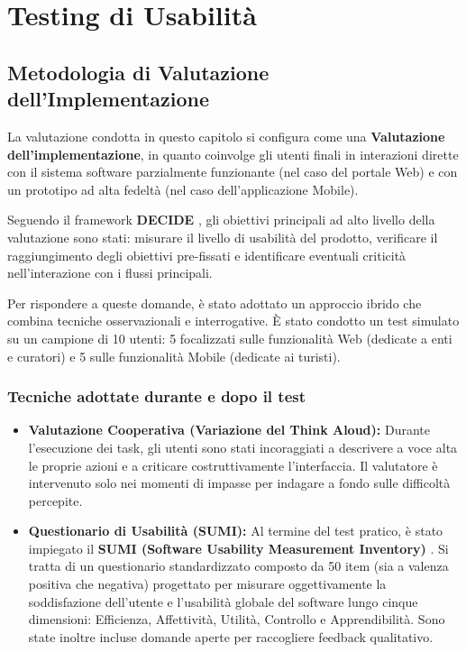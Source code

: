 \section{Testing di Usabilità}

\subsection{Metodologia di Valutazione dell'Implementazione}
La valutazione condotta in questo capitolo si configura come una \textbf{Valutazione dell'implementazione}, in quanto coinvolge gli utenti finali in interazioni dirette con il sistema software parzialmente funzionante (nel caso del portale Web) e con un prototipo ad alta fedeltà (nel caso dell'applicazione Mobile).

Seguendo il framework \textbf{DECIDE} \cite{preece2015interaction}, gli obiettivi principali ad alto livello della valutazione sono stati: misurare il livello di usabilità del prodotto, verificare il raggiungimento degli obiettivi pre-fissati e identificare eventuali criticità nell'interazione con i flussi principali.

Per rispondere a queste domande, è stato adottato un approccio ibrido che combina tecniche osservazionali e interrogative. È stato condotto un test simulato su un campione di 10 utenti: 5 focalizzati sulle funzionalità Web (dedicate a enti e curatori) e 5 sulle funzionalità Mobile (dedicate ai turisti).

\subsubsection{Tecniche adottate durante e dopo il test}
\begin{itemize}
    \item \textbf{Valutazione Cooperativa (Variazione del Think Aloud):} Durante l'esecuzione dei task, gli utenti sono stati incoraggiati a descrivere a voce alta le proprie azioni e a criticare costruttivamente l'interfaccia. Il valutatore è intervenuto solo nei momenti di impasse per indagare a fondo sulle difficoltà percepite.
    \item \textbf{Questionario di Usabilità (SUMI):} Al termine del test pratico, è stato impiegato il \textbf{SUMI (Software Usability Measurement Inventory)} \cite{kirakowski1993sumi}. Si tratta di un questionario standardizzato composto da 50 item (sia a valenza positiva che negativa) progettato per misurare oggettivamente la soddisfazione dell'utente e l'usabilità globale del software lungo cinque dimensioni: Efficienza, Affettività, Utilità, Controllo e Apprendibilità. Sono state inoltre incluse domande aperte per raccogliere feedback qualitativo.
\end{itemize}

